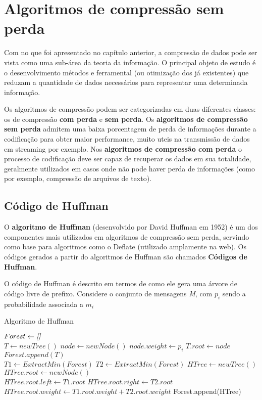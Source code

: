 \chapter{Algoritmos de compressão sem perda}

Com no que foi apresentado no capítulo anterior, a compressão de dados pode ser vista como uma sub-área da teoria da informação. O principal objeto de estudo é o desenvolvimento métodos e ferramental (ou otimização dos já existentes) que reduzam a quantidade de dados necessários para representar uma determinada informação.

Os algoritmos de compressão podem ser categorizadas em duas diferentes classes: os de compressão \textbf{com perda} e \textbf{sem perda}. Os \textbf{algoritmos de compressão sem perda} admitem uma baixa porcentagem de perda de informações durante a codificação para obter maior performance, muito uteis na transmissão de dados em streaming por exemplo. Nos \textbf{algoritmos de compressão com perda} o processo de codificação deve ser capaz de recuperar os dados em sua totalidade, geralmente utilizados em casos onde não pode haver perda de informações (como por exemplo, compressão de arquivos de texto).

\pagebreak

\section{Código de Huffman}
O \textbf{algoritmo de Huffman} (desenvolvido por David Huffman em 1952) é um dos componentes mais utilizados em algoritmos de compressão sem perda, servindo como base para algoritmos como o Deflate (utilizado amplamente na web).
Os códigos gerados a partir do algoritmos de Huffman são chamados \textbf{Códigos de Huffman}.

O código de Huffman é descrito em termos de como ele gera uma árvore de código livre de prefixo. Considere o conjunto de mensagens \emph{M}, com $p_i$ sendo a probabilidade associada a $m_i$

\begin{algorithm}[H]
\caption{Algoritmo de Huffman} \label{alg:huff}
\begin{algorithmic}
	\State $Forest \gets \emph{[]}$\\
	 
		\State $T \gets newTree()$
		\State $node \gets newNode()$
		\State $node.weight \gets p_i$ 
		\State $T.root \gets node$
		\State $Forest.append(T)$ 
	\EndFor \\
	
		\State $T1 \gets ExtractMin(Forest)$ 
		\State $T2 \gets ExtractMin(Forest)$
		\State $HTree \gets newTree()$
		\State $HTree.root \gets newNode()$ \\
		\State $HTree.root.left \gets T1.root$
		\State $HTree.root.right \gets T2.root$
		\State $HTree.root.weight \gets T1.root.weight + T2.root.weight$
		\State Forest.append(HTree) 
	\EndWhile
\end{algorithmic}
\end{algorithm}

